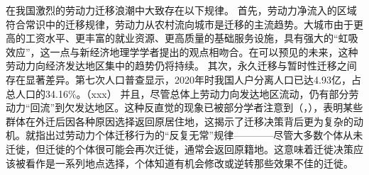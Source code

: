 \documentclass[
  a4paper,
  zihao=-4,
  fontset=mac,
  AutoFakeBold,
  AutoFakeSlant,
  oneside]{ctexbook}
\begin{document}
在我国激烈的劳动力迁移浪潮中大致存在以下规律。
首先，劳动力净流入的区域符合常识中的迁移规律，劳动力从农村流向城市是迁移的主流趋势。大城市由于更高的工资水平、更丰富的就业资源、更高质量的基础服务设施，具有强大的“虹吸效应”，这一点与新经济地理学学者提出的观点相吻合。在可以预见的未来，这种劳动力向经济发达地区集中的趋势仍将持续。
其次，永久迁移与暂时性迁移之间存在显著差异。第七次人口普查显示，2020年时我国人户分离人口已达4.93亿，占总人口的34.16\%。（xxx）
并且，尽管总体上劳动力向发达地区流动，仍有部分劳动力“回流”到欠发达地区。这种反直觉的现象已被部分学者注意到（\textcite{ShiZhiLeiJiaTingBingFuJiaTingJueCeYuNongCunQianYiLaoDongLiHuiLiu2012}，\textcite{RenYuanNongCunWaiChuLaoDongLiHuiLiuQianYiDeYingXiangYinSuHeHuiLiuXiaoYing2017}），表明某些群体在外迁后因各种原因选择返回原居住地，这揭示了迁移决策背后更为复杂的动机。\textcite{davanzoRepeatMigrationUnited1983}就指出过劳动力个体迁移行为的“反复无常”规律————尽管大多数个体从未迁徙，但迁徙的个体很可能会再次迁徙，通常会返回原籍地。这意味着迁徙决策应该被看作是一系列地点选择，个体知道有机会修改或逆转那些效果不佳的迁徙。
\end{document}
